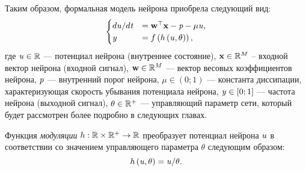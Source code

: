 Таким образом, формальная модель нейрона приобрела следующий вид:
\begin{equation}
	\label{eq:full_single_neuron_model}
    \begin{cases}
        d\mathit{u} / d\mathit{t}   &=  \mathrm{\mathbf{w}}^{\top} \mathrm{\mathbf{x}} - \mathit{p} - \mu \mathit{u}, \\
        \mathit{y}                  &=  f\left( h\left( \mathit{u}, \theta \right) \right), \\
    \end{cases}
\end{equation}
где $\mathit{u} \in \mathbb{R}$ --- потенциал нейрона (внутреннее состояние), $\mathrm{\mathbf{x}} \in \mathbb{R}^{M}$ -- входной вектор нейрона (входной сигнал), $\mathrm{\mathbf{w}} \in \mathbb{R}^{M}$ --- вектор весовых коэффициентов нейрона,  $\mathit{p}$ --- внутренний порог нейрона, $\mu \in \left(0;1\right)$ --- константа диссипации, характеризующая скорость убывания потенциала нейрона, $\mathit{y} \in \left[0;1\right]$ --- частота нейрона (выходной сигнал), $\theta \in \mathbb{R}^{+}$ --- управляющий параметр сети, который будет рассмотрен более подробно в следующих главах.

Функция \textit{модуляции} $h: \mathbb{R} \times \mathbb{R}^{+} \to \mathbb{R}$ преобразует потенциал нейрона $\mathit{u}$ в соответствии со значением управляющего параметра $\theta$ следующим образом:
\begin{equation}
    \label{eq:h_function}
    h\left( \mathit{u}, \theta \right) = \mathit{u} / \theta.
\end{equation}

